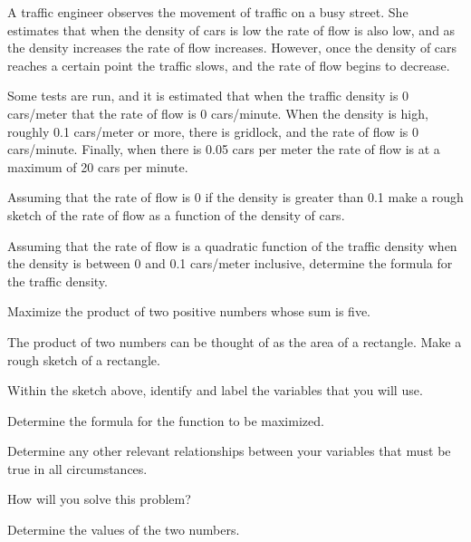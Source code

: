 \begin{problem}

\item A traffic engineer observes the movement of traffic on a busy
  street. She estimates that when the density of cars is low the rate
  of flow is also low, and as the density increases the rate of flow
  increases. However, once the density of cars reaches a certain point
  the traffic slows, and the rate of flow begins to decrease.

  Some tests are run, and it is estimated that when the traffic
  density is 0 cars/meter that the rate of flow is 0 cars/minute. When
  the density is high, roughly 0.1 cars/meter or more, there is
  gridlock, and the rate of flow is 0 cars/minute. Finally, when there
  is 0.05 cars per meter the rate of flow is at a maximum of 20 cars
  per minute.
  
  \begin{subproblem}
  \item Assuming that the rate of flow is 0 if the density is greater
    than 0.1 make a rough sketch of the rate of flow as a function of
    the density of cars.
    \vfill
  \item Assuming that the rate of flow is a quadratic function of the
    traffic density when the density is between 0 and 0.1 cars/meter
    inclusive, determine the formula for the traffic density.
    \vfill
  \end{subproblem}

  \clearpage

\item Maximize the product of two positive numbers whose sum is five.
\begin{subproblem}
  \item The product of two numbers can be thought of as the area of a
    rectangle. Make a rough sketch of a rectangle.
    \vfill
  \item Within the sketch above, identify and label the variables
    that you will use.
  \item Determine the formula for the function to be maximized.
    \vfill
  \item Determine any other relevant relationships between your
    variables that must be true in all circumstances.  
    \vfill
  \item How will you solve this problem?
    \vfill
  \item Determine the values of the two numbers.
    \vfill
    \vfill
\end{subproblem}


\end{problem}
